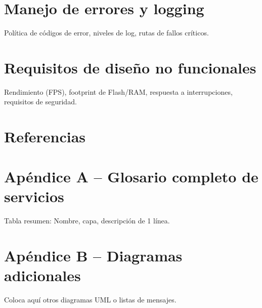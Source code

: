 \documentclass[11pt,a4paper]{article}
\begin{document}
\section{Manejo de errores y logging}
Política de códigos de error, niveles de log, rutas de fallos críticos.

\section{Requisitos de diseño no funcionales}
Rendimiento (FPS), footprint de Flash/RAM, respuesta a interrupciones, requisitos de seguridad.

\section{Referencias}

% 

\appendix
\section{Apéndice A – Glosario completo de servicios}
Tabla resumen: Nombre, capa, descripción de 1 línea.

\section{Apéndice B – Diagramas adicionales}
Coloca aquí otros diagramas UML o listas de mensajes.
\end{document}
